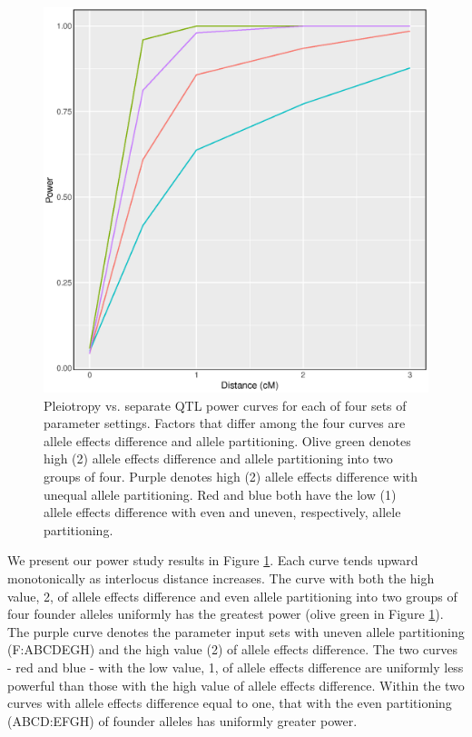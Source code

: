 \documentclass[12pt,twoside, lineno]{gsajnl}
\begin{document}
\begin{figure}
\includegraphics[width = \textwidth]{../R/power-curves.eps}
\caption{Pleiotropy vs. separate QTL power curves for each of four
  sets of parameter settings. Factors that differ among the four
  curves are allele effects difference and allele partitioning. Olive
  green denotes high (2) allele effects difference and allele
  partitioning into two groups of four. Purple denotes high (2) allele
  effects difference with unequal allele partitioning. Red and blue
  both have the low (1) allele effects difference with even and
  uneven, respectively, allele partitioning.}
\label{fig:power}
\end{figure}

We present our power study results in Figure \ref{fig:power}. Each
curve tends upward monotonically as interlocus distance increases. The
curve with both the high value, 2, of allele effects difference and
even allele partitioning into two groups of four founder alleles
uniformly has the greatest power (olive green in Figure
\ref{fig:power}). The purple curve denotes the parameter input sets
with uneven allele partitioning (F:ABCDEGH) and the high value (2) of
allele effects difference. The two curves - red and blue - with the
low value, 1, of allele effects difference are uniformly less powerful
than those with the high value of allele effects difference. Within
the two curves with allele effects difference equal to one, that with
the even partitioning (ABCD:EFGH) of founder alleles has uniformly
greater power.
\end{document}

